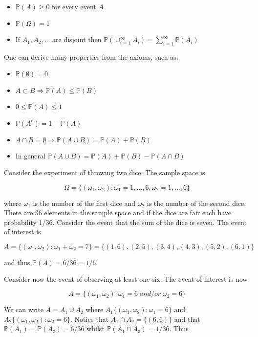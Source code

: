 \documentclass[
]{book}
\providecommand{\tightlist}{%
  \setlength{\itemsep}{0pt}\setlength{\parskip}{0pt}}
\theoremstyle{definition}
\theoremstyle{definition}
\theoremstyle{definition}
\theoremstyle{definition}
\theoremstyle{remark}
\begin{document}
\begin{itemize}
\tightlist
\item
  \(\mathbb{P}(A)\geq 0\) for every event \(A\)
\item
  \(\mathbb{P}(\Omega)=1\)
\item
  If \(A_1,A_2,\dots\) are disjoint then \(\mathbb{P}(\cup_{i=1}^\infty A_i)=\sum_{i=1}^\infty\mathbb{P}(A_i)\)
\end{itemize}

One can derive many properties from the axioms, such as:

\begin{itemize}
\tightlist
\item
  \(\mathbb{P}(\emptyset)=0\)
\item
  \(A\subset B \Rightarrow \mathbb{P}(A) \leq \mathbb{P}(B)\)
\item
  \(0\leq \mathbb{P}(A) \leq 1\)
\item
  \(\mathbb{P}(A^c)= 1-\mathbb{P}(A)\)
\item
  \(A\cap B = \emptyset \Rightarrow \mathbb{P}(A\cup B) = \mathbb{P}(A)+\mathbb{P}(B)\)
\item
  In general \(\mathbb{P}(A\cup B) = \mathbb{P}(A)+\mathbb{P}(B)- \mathbb{P}(A\cap B)\)
\end{itemize}

Consider the experiment of throwing two dice. The sample space is

\[
\Omega = \{(\omega_1,\omega_2): \omega_1=1,\dots,6, \omega_2=1,\dots,6\}
\]

where \(\omega_1\) is the number of the first dice and \(\omega_2\) is the number of the second dice. There are 36 elements in the sample space and if the dice are fair each have probability 1/36. Consider the event that the sum of the dice is seven. The event of interest is

\[
A=\{(\omega_1,\omega_2):\omega_1+\omega_2=7\}=\{(1,6),(2,5),(3,4),(4,3),(5,2),(6,1)\}
\]

and thus \(\mathbb{P}(A)=6/36=1/6\).

Consider now the event of observing at least one six. The event of interest is now

\[
A=\{(\omega_1,\omega_2): \omega_1=6 \; and/or \; \omega_2=6\}
\]

We can write \(A=A_1\cup A_2\) where \(A_1\{(\omega_1,\omega_2): \omega_1=6 \}\) and \(A_2\{(\omega_1,\omega_2): \omega_2=6 \}\). Notice that \(A_1\cap A_2 =\{(6,6)\}\) and that \(\mathbb{P}(A_1)=\mathbb{P}(A_2)=6/36\) whilst \(\mathbb{P}(A_1\cap A_2)=1/36\). Thus
\end{document}
